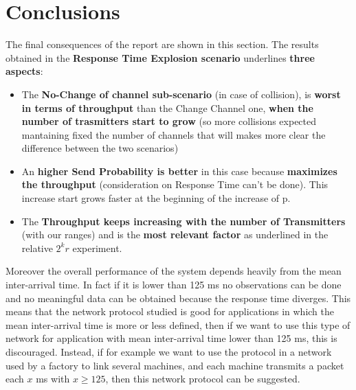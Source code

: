 \section{Conclusions}
The final consequences of the report are shown in this section. 
The results obtained in the \textbf{Response Time Explosion scenario} underlines \textbf{three aspects}:
\begin{itemize}
	\item The \textbf{No-Change of channel sub-scenario} (in case of collision), is \textbf{worst in terms of throughput} than the Change Channel one, \textbf{when the number of trasmitters start to grow} (so more collisions expected mantaining fixed the number of channels that will makes more clear the difference between the two scenarios)
	\item An \textbf{higher Send Probability is better} in this case because \textbf{maximizes the throughput} (consideration on Response Time can't be done). This increase start grows faster at the beginning of the increase of p. 
	\item The \textbf{Throughput keeps increasing with the number of Transmitters} (with our ranges) and is the \textbf{most relevant factor} as underlined in the relative $2^{k}r$ experiment.
\end{itemize} 

\noindent %

\noindent Moreover the overall performance of the system depends heavily from the mean inter-arrival time. In fact if it is lower than 125 ms no observations can be done and no meaningful data can be obtained because the response time diverges. This means that the network protocol studied is good for applications in which the mean inter-arrival time is more or less defined, then if we want to use this type of network for application with mean inter-arrival time lower than 125 ms, this is discouraged. Instead, if for example we want to use the protocol in a network used by a factory to link several machines, and each machine transmits a packet each $x$ ms with $x\ge125$, then this network protocol can be suggested.

